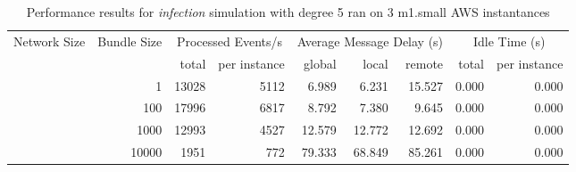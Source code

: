 \begin{table}
	  \caption[Performance results, \emph{infection:5 on 3 m1.small instances }]{ Performance results for \emph{ infection } simulation with degree 5 ran on 3 m1.small AWS instantances }
	\begin{tabular}{rrrrrrrrr}
	\hline\noalign{\smallskip}

	Network Size &
	Bundle Size &
	\multicolumn{2}{c}{Processed Events/s} & 
	\multicolumn{3}{c}{Average Message Delay (s)} & 
	\multicolumn{2}{c}{Idle Time (s)}  \\

	 & 
	 & 
	 total & per instance
     & global & local & remote
     & total & per instance\\

			
				\noalign{\smallskip}\hline
				\multirow{ 4 }{*}{ 40000 } &
				
					
					 
					\multirow{ 1 }{*}{ 1 } &
					
						
							    
							     13028  & 5112  
	                           & 6.989 & 6.231 & 15.527
	                           & 0.000 & 0.000  \\
	                
	            
					 &  
					 
					\multirow{ 1 }{*}{ 100 } &
					
						
							    
							     17996  & 6817  
	                           & 8.792 & 7.380 & 9.645
	                           & 0.000 & 0.000  \\
	                
	            
					 &  
					 
					\multirow{ 1 }{*}{ 1000 } &
					
						
							    
							     12993  & 4527  
	                           & 12.579 & 12.772 & 12.692
	                           & 0.000 & 0.000  \\
	                
	            
					 &  
					 
					\multirow{ 1 }{*}{ 10000 } &
					
						
							    
							     1951  & 772  
	                           & 79.333 & 68.849 & 85.261
	                           & 0.000 & 0.000  \\
	                

\end{tabular}
\end{table}
